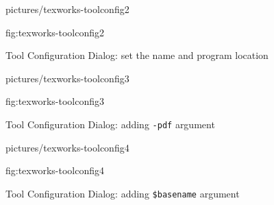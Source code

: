 \begin{figure}[htbp]
\figconts
 {pictures/texworks-toolconfig2}
 {%
    \caption{Tool Configuration Dialog: set the name and program
location}
 }
 {fig:texworks-toolconfig2} 
\end{figure}

\begin{figure}[htbp]
\figconts
 {pictures/texworks-toolconfig3}
 {%
    \caption{Tool Configuration Dialog: adding \protect\texttt{-pdf} argument}
 }
 {fig:texworks-toolconfig3} 
\end{figure}

\begin{figure}[htbp]
\figconts
 {pictures/texworks-toolconfig4}
 {%
    \caption{Tool Configuration Dialog: adding \protect\texttt{\$basename} argument}
 }
 {fig:texworks-toolconfig4} 
\end{figure}

